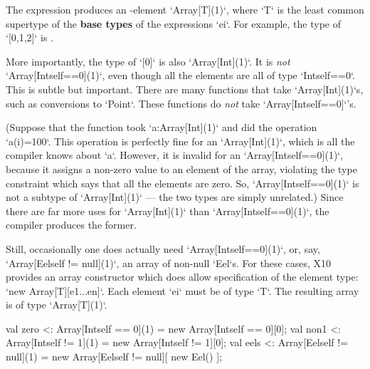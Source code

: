 The expression \Xcd{[e1,e2,e3, ..., en]} produces an -element
\xcd`Array[T](1)`, where \xcd`T` is the least common supertype of the {\bf
  base types} of the expressions \xcd`ei`. For example, the type of
\xcd`[0,1,2]` is .    

More importantly, the type of 
\xcd`[0]` is also \xcd`Array[Int](1)`.  It is {\em not} 
\xcd`Array[Int{self==0}](1)`, even though all the elements are all 
of type \xcd`Int{self==0}`.  This is subtle but important. There are many
functions that take \xcd`Array[Int](1)`s, such as conversions to \xcd`Point`.
These functions do {\em not} take
\xcd`Array[Int{self==0}]`'s.

(Suppose that the function took \xcd`a:Array[Int](1)` and did 
the operation \xcd`a(i)=100`.   This operation is perfectly fine for
an \xcd`Array[Int](1)`, which is all the compiler knows about \xcd`a`.  
However, it is invalid for an \xcd`Array[Int{self==0}](1)`, because it assigns
a non-zero value to an element of the array, violating the type constraint
which says that all the elements are zero.  So, \xcd`Array[Int{self==0}](1)`
is not a subtype of \xcd`Array[Int](1)` --- the two types are simply unrelated.)
Since there are far more uses for \xcd`Array[Int](1)` than
\xcd`Array[Int{self==0}](1)`, the compiler produces the former.

Still, occasionally one does actually need \xcd`Array[Int{self==0}](1)`, 
or, say, \xcd`Array[Eel{self != null}](1)`, an array of non-null \xcd`Eel`s.  
For these cases, X10 provides an array constructor which does allow
specification of the element type: \xcd`new Array[T][e1...en]`.  Each
element \xcd`ei` must be of type \xcd`T`.  The resulting array is of type
\xcd`Array[T](1)`.  
\begin{xten}
val zero <: Array[Int{self == 0}](1) = new Array[Int{self == 0}][0];
val non1 <: Array[Int{self != 1}](1) = new Array[Int{self != 1}][0];
val eels <: Array[Eel{self != null}](1) = 
    new Array[Eel{self != null}][ new Eel() ];
\end{xten}



